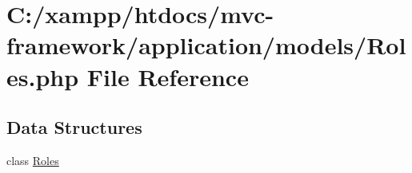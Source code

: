 \hypertarget{_roles_8php}{}\section{C\+:/xampp/htdocs/mvc-\/framework/application/models/\+Roles.php File Reference}
\label{_roles_8php}
\subsection*{Data Structures}
\begin{DoxyCompactItemize}
\item 
class \hyperlink{class_roles}{Roles}
\end{DoxyCompactItemize}
